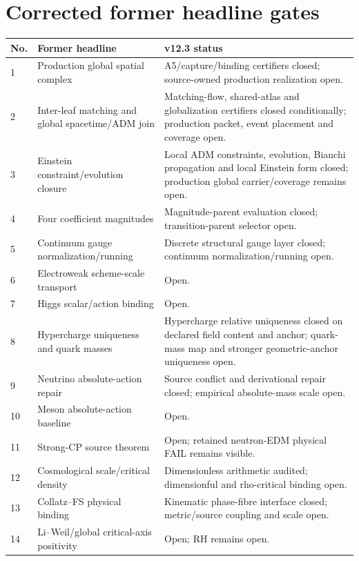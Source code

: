 \documentclass[11pt,a4paper,twoside]{book}
\theoremstyle{definition}
\begin{document}
\section{Corrected former headline gates}

\begin{longtable}{p{}p{}p{}}
\toprule
No. & Former headline & v12.3 status \\
\midrule
1 & Production global spatial complex &
A5/capture/binding certifiers closed; source-owned production realization open. \\
2 & Inter-leaf matching and global spacetime/ADM join &
Matching-flow, shared-atlas and globalization certifiers closed conditionally;
production packet, event placement and coverage open. \\
3 & Einstein constraint/evolution closure &
Local ADM constraints, evolution, Bianchi propagation and local Einstein form
closed; production global carrier/coverage remains open. \\
4 & Four coefficient magnitudes &
Magnitude-parent evaluation closed; transition-parent selector open. \\
5 & Continuum gauge normalization/running &
Discrete structural gauge layer closed; continuum normalization/running open. \\
6 & Electroweak scheme-scale transport &
Open. \\
7 & Higgs scalar/action binding &
Open. \\
8 & Hypercharge uniqueness and quark masses &
Hypercharge relative uniqueness closed on declared field content and anchor;
quark-mass map and stronger geometric-anchor uniqueness open. \\
9 & Neutrino absolute-action repair &
Source conflict and derivational repair closed; empirical absolute-mass scale
open. \\
10 & Meson absolute-action baseline &
Open. \\
11 & Strong-CP source theorem &
Open; retained neutron-EDM physical FAIL remains visible. \\
12 & Cosmological scale/critical density &
Dimensionless arithmetic audited; dimensionful and rho-critical binding open. \\
13 & Collatz--FS physical binding &
Kinematic phase-fibre interface closed; metric/source coupling and scale open. \\
14 & Li--Weil/global critical-axis positivity &
Open; RH remains open. \\
\bottomrule
\end{longtable}
\end{document}
